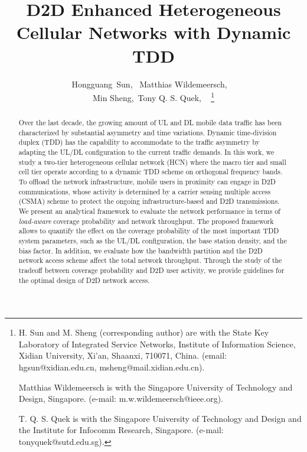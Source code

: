 \documentclass[twocolumn,english]{IEEEtran}
\theoremstyle{plain}
\theoremstyle{definition}
\begin{document}
\title{D2D Enhanced Heterogeneous Cellular Networks with Dynamic TDD}


\author{Hongguang~Sun, ~Matthias Wildemeersch,~~\\
Min Sheng,~Tony Q. S. Quek, ~
\thanks{H. Sun and M. Sheng (corresponding author) are with the State Key
Laboratory of Integrated Service Networks, Institute of Information
Science, Xidian University, Xi'an, Shaanxi, 710071, China. (email:
hgsun@xidian.edu.cn, msheng@mail.xidian.edu.cn).

Matthias Wildemeersch is with the Singapore University of Technology
and Design, Singapore. (e-mail: m.w.wildemeersch@ieee.org).

T. Q. S. Quek is with the Singapore University of Technology and Design
and the Institute for Infocomm Research, Singapore. (e-mail: tonyquek@sutd.edu.sg).}}
\maketitle
\begin{abstract}
Over the last decade, the growing amount of UL and DL mobile data
traffic has been characterized by substantial asymmetry and time variations.
Dynamic time-division duplex (TDD) has the capability to accommodate
to the traffic asymmetry by adapting the UL/DL configuration to the
current traffic demands. In this work, we study a two-tier heterogeneous
cellular network (HCN) where the macro tier and small cell tier operate
according to a dynamic TDD scheme on orthogonal frequency bands. To
offload the network infrastructure, mobile users in proximity can
engage in D2D communications, whose activity is determined by a carrier
sensing multiple access (CSMA) scheme to protect the ongoing infrastructure-based
and D2D transmissions. We present an analytical framework to evaluate
the network performance in terms of \emph{load-aware} coverage probability
and network throughput. The proposed framework allows to quantify
the effect on the coverage probability of the most important TDD system
parameters, such as the UL/DL configuration, the base station density,
and the bias factor. In addition, we evaluate how the bandwidth partition
and the D2D network access scheme affect the total network throughput.
Through the study of the tradeoff between coverage probability and
D2D user activity, we provide guidelines for the optimal design of
D2D network access. \end{abstract}
\end{document}
